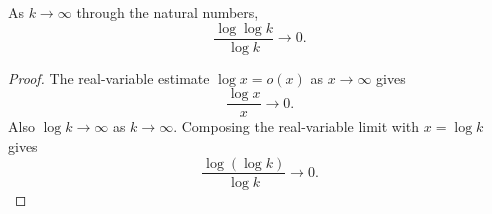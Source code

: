 \begin{helper}
As \(k\to\infty\) through the natural numbers,
\[
\frac{\log\log k}{\log k}\to0 .
\]
\end{helper}
\begin{proof}
The real-variable estimate \(\log x=o(x)\) as \(x\to\infty\) gives
\[
\frac{\log x}{x}\to0 .
\]
Also \(\log k\to\infty\) as \(k\to\infty\).  Composing the real-variable
limit with \(x=\log k\) gives
\[
\frac{\log(\log k)}{\log k}\to0 .
\]
\end{proof}
